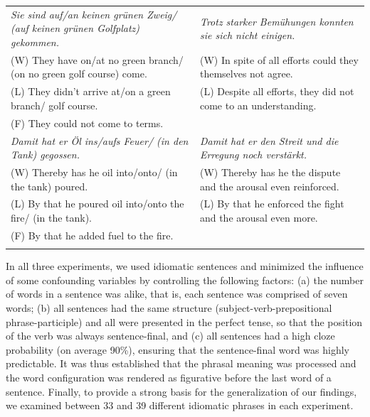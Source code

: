 \documentclass[output=paper]{langsci/langscibook}
\begin{document}
\begin{table}
\begin{tabularx}{\textwidth}{QQ}
\textit{Sie sind auf/an keinen grünen Zweig/ (auf keinen grünen Golfplatz) gekommen.} & \textit{Trotz starker Bemühungen konnten sie sich nicht einigen.} \\
\hspace{3mm}(W) They have on/at no green branch/ (on no green golf course) come.                  & \hspace{3mm}(W) In spite of all efforts could they themselves not agree.      \\
\hspace{3mm}(L) They didn’t arrive at/on a green branch/ golf course.                             & \hspace{3mm}(L) Despite all efforts, they did not come to an understanding.   \\
\hspace{3mm}(F) They could not come to terms.                                                     &                                                                   \\ \tablevspace
\textit{Damit hat er Öl ins/aufs Feuer/ (in den Tank) gegossen.}                      & \textit{Damit hat er den Streit und die Erregung noch verstärkt.} \\
\hspace{3mm}(W) Thereby has he oil into/onto/ (in the tank) poured.                               & \hspace{3mm}(W) Thereby has he the dispute and the arousal even reinforced.   \\
\hspace{3mm}(L) By that he poured oil into/onto the fire/ (in the tank).                          & \hspace{3mm}(L) By that he enforced the fight and the arousal even more.      \\
\hspace{3mm}(F) By that he added fuel to the fire.                                                &                                                                   \\ \lspbottomrule
\end{tabularx}
\end{table}

In all three experiments, we used idiomatic sentences and minimized the influence of some confounding variables by controlling the following factors: (a) the number of words in a sentence was alike, that is, each sentence was comprised of seven words; (b) all sentences had the same structure (subject-verb-prepositional phrase-participle) and all were presented in the perfect tense, so that the position of the verb was always sentence-final, and (c) all sentences had a high cloze probability (on average 90\%), ensuring that the sentence-final word was highly predictable. It was thus established that the phrasal meaning was processed and the word configuration was rendered as figurative before the last word of a sentence. Finally, to provide a strong basis for the generalization of our findings, we examined between 33 and 39 different idiomatic phrases in each experiment. 
\end{document}
